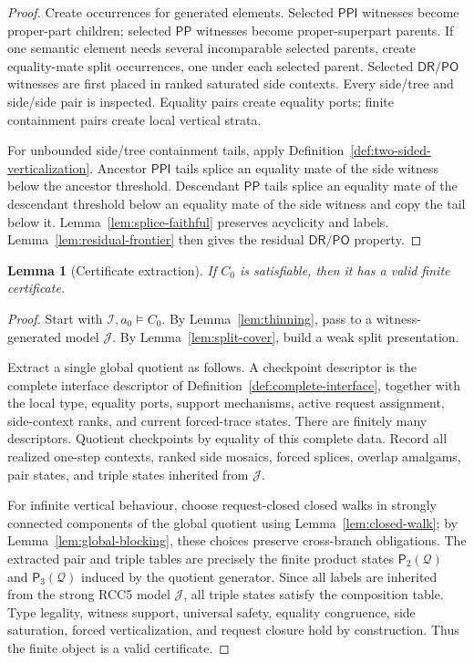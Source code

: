 \documentclass[11pt]{article}
\newtheorem{lemma}[theorem]{Lemma}
\newcommand{\DR}{\mathsf{DR}}
\newcommand{\PO}{\mathsf{PO}}
\newcommand{\PP}{\mathsf{PP}}
\newcommand{\PPI}{\mathsf{PPI}}
\newcommand{\I}{\mathcal I}
\newcommand{\J}{\mathcal J}
\newcommand{\Q}{\mathcal Q}
\newcommand{\Pairs}{\mathsf P_2}
\newcommand{\Triples}{\mathsf P_3}
\begin{document}
\begin{proof}
Create occurrences for generated elements.  Selected $\PPI$ witnesses become proper-part children; selected $\PP$ witnesses become proper-superpart parents.  If one semantic element needs several incomparable selected parents, create equality-mate split occurrences, one under each selected parent.  Selected $\DR/\PO$ witnesses are first placed in ranked saturated side contexts.  Every side/tree and side/side pair is inspected.  Equality pairs create equality ports; finite containment pairs create local vertical strata.

For unbounded side/tree containment tails, apply Definition~\ref{def:two-sided-verticalization}.  Ancestor $\PPI$ tails splice an equality mate of the side witness below the ancestor threshold.  Descendant $\PP$ tails splice an equality mate of the descendant threshold below an equality mate of the side witness and copy the tail below it.  Lemma~\ref{lem:splice-faithful} preserves acyclicity and labels.  Lemma~\ref{lem:residual-frontier} then gives the residual $\DR/\PO$ property.
\end{proof}

\begin{lemma}[Certificate extraction]
\label{lem:extraction}
If $C_0$ is satisfiable, then it has a valid finite certificate.
\end{lemma}

\begin{proof}
Start with $\I,a_0\models C_0$.  By Lemma~\ref{lem:thinning}, pass to a witness-generated model $\J$.  By Lemma~\ref{lem:split-cover}, build a weak split presentation.

Extract a single global quotient as follows.  A checkpoint descriptor is the complete interface descriptor of Definition~\ref{def:complete-interface}, together with the local type, equality ports, support mechanisms, active request assignment, side-context ranks, and current forced-trace states.  There are finitely many descriptors.  Quotient checkpoints by equality of this complete data.  Record all realized one-step contexts, ranked side mosaics, forced splices, overlap amalgams, pair states, and triple states inherited from $\J$.

For infinite vertical behaviour, choose request-closed closed walks in strongly connected components of the global quotient using Lemma~\ref{lem:closed-walk}; by Lemma~\ref{lem:global-blocking}, these choices preserve cross-branch obligations.  The extracted pair and triple tables are precisely the finite product states $\Pairs(\Q)$ and $\Triples(\Q)$ induced by the quotient generator.  Since all labels are inherited from the strong RCC5 model $\J$, all triple states satisfy the composition table.  Type legality, witness support, universal safety, equality congruence, side saturation, forced verticalization, and request closure hold by construction.  Thus the finite object is a valid certificate.
\end{proof}
\end{document}
